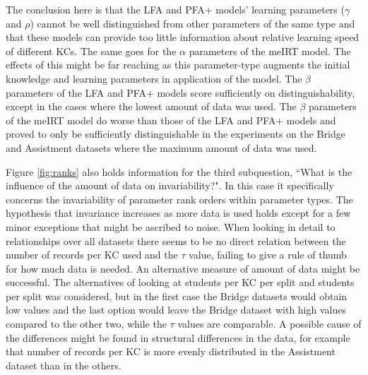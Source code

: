 \documentclass{scrartcl}
\begin{document}

The conclusion here is that the LFA and PFA+ models' learning parameters ($\gamma$ and $\rho$) cannot be well distinguished from other parameters of the same type and that these models can provide too little information about relative learning speed of different KCs. The same goes for the $\alpha$ parameters of the meIRT model. The effects of this might be far reaching as this parameter-type augments the initial knowledge and learning parameters in application of the model. The $\beta$ parameters of the LFA and PFA+ models score sufficiently on distinguishability, except in the cases where the lowest amount of data was used. The $\beta$ parameters of the meIRT model do worse than those of the LFA and PFA+ models and proved to only be sufficiently distinguishable in the experiments on the Bridge and Assistment datasets where the maximum amount of data was used.  

Figure \ref{fig:ranks} also holds information for the third subquestion, ``What is the influence of the amount of data on invariability?". In this case it specifically concerns the invariability of parameter rank orders within parameter types. The hypothesis that invariance increases as more data is used holds except for a few minor exceptions that might be ascribed to noise. When looking in detail to relationships over all datasets there seems to be no direct relation between the number of records per KC used and the $\tau$ value, failing to give a rule of thumb for how much data is needed. An alternative measure of amount of data might be successful. The alternatives of looking at students per KC per split and students per split was considered, but in the first case the Bridge datasets would obtain low values and the last option would leave the Bridge dataset with high values compared to the other two, while the $\tau$ values are comparable. A possible cause of the differences might be found in structural differences in the data, for example that number of records per KC is more evenly distributed in the Assistment dataset than in the others.  
\end{document}
